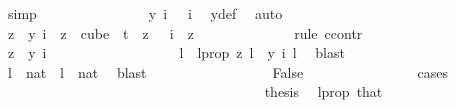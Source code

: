 \begin{isabellebody}
\ simp\isanewline
\ \ \ \ \ \ \ \ \ \ \ \ \isamarkupfalse%
\ \isamarkupfalse%
\ {\isachardoublequoteopen}y\ i\ {}\ {\isacharequal}{\kern0pt}\ i{\isachardoublequoteclose}\ \isamarkupfalse%
\ y{\isacharunderscore}{\kern0pt}def\ \isamarkupfalse%
\ auto\isanewline
\ \ \ \ \ \ \ \ \ \ \ \ \isamarkupfalse%
\ \isamarkupfalse%
\ {\isachardoublequoteopen}z\ {\isacharequal}{\kern0pt}\ y\ i{\isachardoublequoteclose}\ \ {\isachardoublequoteopen}z\ {\isasymin}\ cube\ {}\ t{\isachardoublequoteclose}\ \ {\isachardoublequoteopen}z\ {}\ {\isacharequal}{\kern0pt}\ i{\isachardoublequoteclose}\ \ z\isanewline
\ \ \ \ \ \ \ \ \ \ \ \ \isamarkupfalse%
\ {\isacharparenleft}{\kern0pt}rule\ ccontr{\isacharparenright}{\kern0pt}\isanewline
\ \ \ \ \ \ \ \ \ \ \ \ \ \ \isamarkupfalse%
\ {\isachardoublequoteopen}z\ {\isasymnoteq}\ y\ i{\isachardoublequoteclose}\ \isanewline
\ \ \ \ \ \ \ \ \ \ \ \ \ \ \isamarkupfalse%
\ \isamarkupfalse%
\ l\ \ l{\isacharunderscore}{\kern0pt}prop{\isacharcolon}{\kern0pt}\ {\isachardoublequoteopen}z\ l\ {\isasymnoteq}\ y\ i\ l{\isachardoublequoteclose}\ \isamarkupfalse%
\ blast\isanewline
\ \ \ \ \ \ \ \ \ \ \ \ \ \ \isamarkupfalse%
\ {\isachardoublequoteopen}l\ {\isasymin}\ {\isacharbraceleft}{\kern0pt}{\isachardot}{\kern0pt}{\isachardot}{\kern0pt}{\isacharless}{\kern0pt}{}{\isacharcolon}{\kern0pt}{\isacharcolon}{\kern0pt}nat{\isacharbraceright}{\kern0pt}{\isachardoublequoteclose}\ {\isacharbar}{\kern0pt}\ {\isachardoublequoteopen}l\ {\isasymnotin}\ {\isacharbraceleft}{\kern0pt}{\isachardot}{\kern0pt}{\isachardot}{\kern0pt}{\isacharless}{\kern0pt}{}{\isacharcolon}{\kern0pt}{\isacharcolon}{\kern0pt}nat{\isacharbraceright}{\kern0pt}{\isachardoublequoteclose}\ \isamarkupfalse%
\ blast\isanewline
\ \ \ \ \ \ \ \ \ \ \ \ \ \ \isamarkupfalse%
\ \isamarkupfalse%
\ False\isanewline
\ \ \ \ \ \ \ \ \ \ \ \ \ \ \isamarkupfalse%
\ cases\isanewline
\ \ \ \ \ \ \ \ \ \ \ \ \ \ \ \ \isamarkupfalse%
\ {}\isanewline
\ \ \ \ \ \ \ \ \ \ \ \ \ \ \ \ \isamarkupfalse%
\ \isamarkupfalse%
\ {\isacharquery}{\kern0pt}thesis\ \isamarkupfalse%
\ l{\isacharunderscore}{\kern0pt}prop\ that{\isacharparenleft}{\kern0pt}{}{\isacharparenright}{\kern0pt}\ \isamarkupfalse%

\end{isabellebody}
